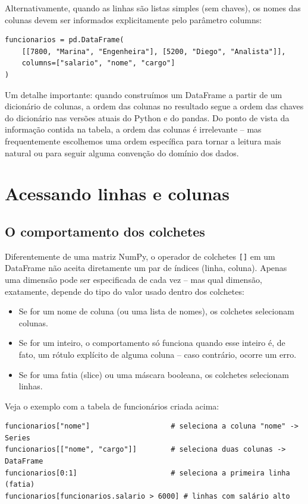 \documentclass[11pt,a4paper]{article}
\begin{document}
Alternativamente, quando as linhas são listas simples (sem chaves), os nomes das colunas devem ser informados explicitamente pelo parâmetro columns:
\begin{lstlisting}
funcionarios = pd.DataFrame(
    [[7800, "Marina", "Engenheira"], [5200, "Diego", "Analista"]],
    columns=["salario", "nome", "cargo"]
)
\end{lstlisting}

Um detalhe importante: quando construímos um DataFrame a partir de um dicionário de colunas, a ordem das colunas no resultado segue a ordem das chaves do dicionário nas versões atuais do Python e do pandas. Do ponto de vista da informação contida na tabela, a ordem das colunas é irrelevante -- mas frequentemente escolhemos uma ordem específica para tornar a leitura mais natural ou para seguir alguma convenção do domínio dos dados.

\section{Acessando linhas e colunas}

\subsection{O comportamento dos colchetes}

Diferentemente de uma matriz NumPy, o operador de colchetes \texttt{[]} em um DataFrame não aceita diretamente um par de índices (linha, coluna). Apenas uma dimensão pode ser especificada de cada vez -- mas qual dimensão, exatamente, depende do tipo do valor usado dentro dos colchetes:
\begin{itemize}
    \item Se for um nome de coluna (ou uma lista de nomes), os colchetes selecionam colunas.
    \item Se for um inteiro, o comportamento só funciona quando esse inteiro é, de fato, um rótulo explícito de alguma coluna -- caso contrário, ocorre um erro.
    \item Se for uma fatia (slice) ou uma máscara booleana, os colchetes selecionam linhas.
\end{itemize}

Veja o exemplo com a tabela de funcionários criada acima:
\begin{lstlisting}
funcionarios["nome"]                   # seleciona a coluna "nome" -> Series
funcionarios[["nome", "cargo"]]        # seleciona duas colunas -> DataFrame
funcionarios[0:1]                      # seleciona a primeira linha (fatia)
funcionarios[funcionarios.salario > 6000] # linhas com salário alto
\end{lstlisting}
\end{document}
